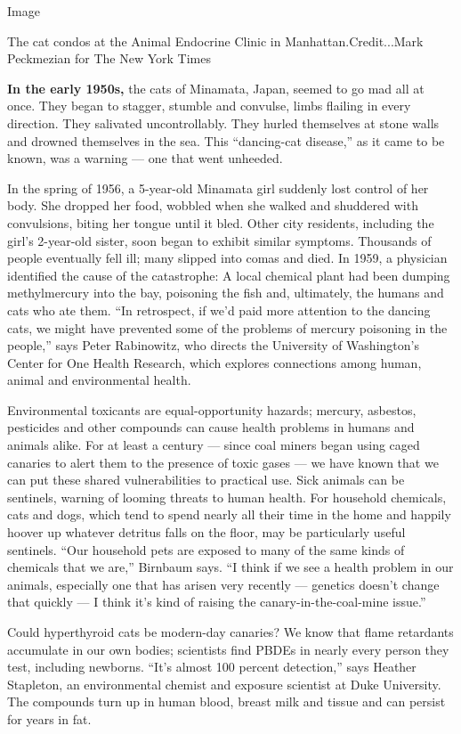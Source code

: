 Image

The cat condos at the Animal Endocrine Clinic in Manhattan.Credit...Mark
Peckmezian for The New York Times

\textbf{In the early 1950s,} the cats of Minamata, Japan, seemed to go
mad all at once. They began to stagger, stumble and convulse, limbs
flailing in every direction. They salivated uncontrollably. They hurled
themselves at stone walls and drowned themselves in the sea. This
``dancing-cat disease,'' as it came to be known, was a warning --- one
that went unheeded.

In the spring of 1956, a 5-year-old Minamata girl suddenly lost control
of her body. She dropped her food, wobbled when she walked and shuddered
with convulsions, biting her tongue until it bled. Other city residents,
including the girl's 2-year-old sister, soon began to exhibit similar
symptoms. Thousands of people eventually fell ill; many slipped into
comas and died. In 1959, a physician identified the cause of the
catastrophe: A local chemical plant had been dumping methylmercury into
the bay, poisoning the fish and, ultimately, the humans and cats who ate
them. ``In retrospect, if we'd paid more attention to the dancing cats,
we might have prevented some of the problems of mercury poisoning in the
people,'' says Peter Rabinowitz, who directs the University of
Washington's Center for One Health Research, which explores connections
among human, animal and environmental health.

Environmental toxicants are equal-opportunity hazards; mercury,
asbestos, pesticides and other compounds can cause health problems in
humans and animals alike. For at least a century --- since coal miners
began using caged canaries to alert them to the presence of toxic gases
--- we have known that we can put these shared vulnerabilities to
practical use. Sick animals can be sentinels, warning of looming threats
to human health. For household chemicals, cats and dogs, which tend to
spend nearly all their time in the home and happily hoover up whatever
detritus falls on the floor, may be particularly useful sentinels. ``Our
household pets are exposed to many of the same kinds of chemicals that
we are,'' Birnbaum says. ``I think if we see a health problem in our
animals, especially one that has arisen very recently --- genetics
doesn't change that quickly --- I think it's kind of raising the
canary-in-the-coal-mine issue.''

Could hyperthyroid cats be modern-day canaries? We know that flame
retardants accumulate in our own bodies; scientists find PBDEs in nearly
every person they test, including newborns. ``It's almost 100 percent
detection,'' says Heather Stapleton, an environmental chemist and
exposure scientist at Duke University. The compounds turn up in human
blood, breast milk and tissue and can persist for years in fat.

